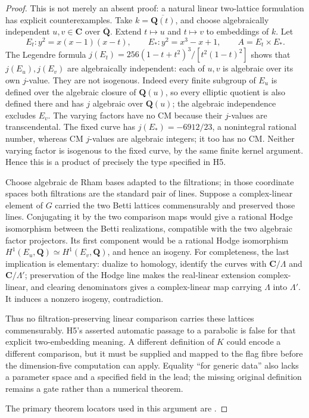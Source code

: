 \begin{proof}
This is not merely an absent proof: a natural linear two-lattice
formulation has explicit counterexamples. Take
\(k=\overline{\mathbf Q(t)}\), and choose algebraically independent
\(u,v\in\mathbf C\) over \(\overline{\mathbf Q}\). Extend
\(t\mapsto u\) and \(t\mapsto v\) to embeddings of \(k\).
Let
\[
E_t:y^2=x(x-1)(x-t),\qquad
E_*:y^2=x^3-x+1,\qquad A=E_t\times E_*.
\]
The Legendre formula
\(j(E_t)=256(1-t+t^2)^3/[t^2(1-t)^2]\) shows that
\(j(E_u),j(E_v)\) are algebraically independent: each of \(u,v\)
is algebraic over its own \(j\)-value. They are not isogenous.
Indeed every finite subgroup of \(E_u\) is defined over the
algebraic closure of \(\mathbf Q(u)\), so every elliptic quotient
is also defined there and has \(j\) algebraic over
\(\mathbf Q(u)\); the algebraic independence excludes \(E_v\).
The varying factors have no CM because their \(j\)-values are
transcendental. The fixed curve has
\(j(E_*)=-6912/23\), a nonintegral rational number, whereas CM
\(j\)-values are algebraic integers; it too has no CM. Neither
varying factor is isogenous to the fixed curve, by the same finite
kernel argument. Hence this is a product of precisely the type
specified in H5.

Choose algebraic de Rham bases adapted to the filtrations; in those
coordinate spaces both filtrations are the standard pair of lines.
Suppose a complex-linear element of \(G\) carried the two Betti
lattices commensurably and preserved those lines. Conjugating it by
the two comparison maps would give a rational Hodge isomorphism
between the Betti realizations, compatible with the two algebraic
factor projectors. Its first component would be a rational Hodge
isomorphism \(H^1(E_u,\mathbf Q)\simeq H^1(E_v,\mathbf Q)\), and
hence an isogeny. For completeness, the last implication is
elementary: dualize to homology, identify the curves with
\(\mathbf C/\Lambda\) and \(\mathbf C/\Lambda'\); preservation
of the Hodge line makes the real-linear extension complex-linear,
and clearing denominators gives a complex-linear map carrying
\(\Lambda\) into \(\Lambda'\). It induces a nonzero isogeny,
contradiction.

Thus no filtration-preserving linear comparison carries these
lattices commensurably. H5's asserted automatic passage to a
parabolic is false for that explicit two-embedding meaning. A
different definition of \(K\) could encode a different comparison,
but it must be supplied and mapped to the flag fibre before the
dimension-five computation can apply. Equality ``for generic data''
also lacks a parameter space and a specified field in the lead;
the missing original definition remains a gate rather than a
numerical theorem.

The primary theorem locators used in this argument are \cite[Theorem 12.14 and Corollary 12.16]{EllMilneMF}.
\end{proof}

